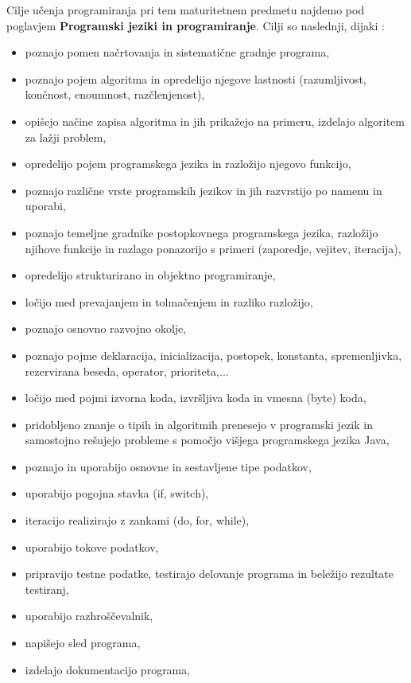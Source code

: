Cilje učenja programiranja pri tem maturitetnem predmetu najdemo pod
poglavjem \textbf{Programski jeziki in programiranje}. Cilji so
naslednji, dijaki \cite{ucni_nacrt-teh-gim}:

\begin{itemize}
\item poznajo pomen načrtovanja in sistematične gradnje programa,
\item poznajo pojem algoritma in opredelijo njegove lastnosti
  (razumljivost, končnost, enoumnost, razčlenjenost),
\item opišejo načine zapisa algoritma in jih prikažejo na primeru,
  izdelajo algoritem za lažji problem,
\item opredelijo pojem programskega jezika in razložijo njegovo
  funkcijo,
\item poznajo različne vrste programskih jezikov in jih
  razvrstijo po namenu in uporabi,
\item poznajo temeljne gradnike postopkovnega programskega jezika, razložijo njihove funkcije in
razlago ponazorijo s primeri (zaporedje, vejitev, iteracija),
\item opredelijo strukturirano in objektno programiranje,
\item ločijo med prevajanjem in tolmačenjem in razliko razložijo,
\item poznajo osnovno razvojno okolje,
\item poznajo pojme deklaracija, inicializacija, postopek, konstanta,
  spremenljivka, rezervirana beseda, operator, prioriteta,...
\item ločijo med pojmi izvorna koda, izvršljiva koda in vmesna (byte)
  koda,
\item pridobljeno znanje o tipih in algoritmih prenesejo v programski
  jezik in samostojno rešujejo probleme s pomočjo višjega programskega
  jezika Java,
\item poznajo in uporabijo osnovne in sestavljene tipe podatkov,
\item uporabijo pogojna stavka (if, switch),
\item iteracijo realizirajo z zankami (do, for, while),
\item uporabijo tokove podatkov,
\item pripravijo testne podatke, testirajo delovanje programa in beležijo rezultate testiranj,
\item uporabijo razhroščevalnik,
\item napišejo sled programa,
\item izdelajo dokumentacijo programa,

\end{itemize}

